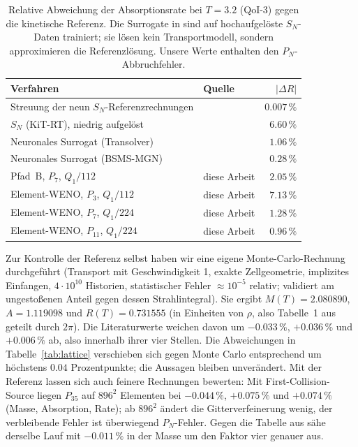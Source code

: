 \begin{table}[htbp]
  \centering
  \small
  \begin{tabular}{p{6.2cm}p{4.2cm}r}
    \toprule
    Verfahren & Quelle & $|\Delta R|$ \\
    \midrule
    Streuung der neun $S_N$-Referenzrechnungen & \cite{schotthoefer_hauck_2025} & $0.007\,\%$ \\
    $S_N$ (KiT-RT), niedrig aufgelöst          & \cite{gonzales_2026}           & $6.60\,\%$ \\
    Neuronales Surrogat (Transolver)          & \cite{gonzales_2026}           & $1.06\,\%$ \\
    Neuronales Surrogat (BSMS-MGN)            & \cite{gonzales_2026}           & $0.28\,\%$ \\
    \midrule
    Pfad~B, $P_7$, $Q_1/112$                  & diese Arbeit & $2.05\,\%$ \\
    Element-WENO, $P_3$, $Q_1/112$            & diese Arbeit & $7.13\,\%$ \\
    Element-WENO, $P_7$, $Q_1/224$            & diese Arbeit & $1.28\,\%$ \\
    Element-WENO, $P_{11}$, $Q_1/224$         & diese Arbeit & $0.96\,\%$ \\
    \bottomrule
  \end{tabular}
  \caption{Relative Abweichung der Absorptionsrate bei $T=3.2$ (QoI-3) gegen die kinetische
           Referenz. Die Surrogate in \cite{gonzales_2026} sind auf hochaufgelöste $S_N$-Daten
           trainiert; sie lösen kein Transportmodell, sondern approximieren die Referenzlösung.
           Unsere Werte enthalten den $P_N$-Abbruchfehler.}
  \label{tab:lattice:lit}
\end{table}

Zur Kontrolle der Referenz selbst haben wir eine eigene Monte-Carlo-Rechnung durchgeführt
(Transport mit Geschwindigkeit 1, exakte Zellgeometrie, implizites Einfangen, $4\cdot10^{10}$
Historien, statistischer Fehler $\approx10^{-5}$ relativ; validiert am ungestoßenen Anteil gegen
dessen Strahlintegral). Sie ergibt $M(T)=2.080890$, $A=1.119098$ und $R(T)=0.731555$ (in
Einheiten von $\rho$, also Tabelle~1 aus \cite{schotthoefer_hauck_2025} geteilt durch $2\pi$). Die
Literaturwerte weichen davon um $-0.033\,\%$, $+0.036\,\%$ und $+0.006\,\%$ ab, also innerhalb ihrer
vier Stellen. Die Abweichungen in Tabelle~\ref{tab:lattice} verschieben sich gegen Monte Carlo
entsprechend um höchstens $0.04$ Prozentpunkte; die Aussagen bleiben unverändert.
Mit der Referenz lassen sich auch feinere Rechnungen bewerten: Mit First-Collision-Source liegen
$P_{35}$ auf $896^2$ Elementen bei $-0.044\,\%$, $+0.075\,\%$ und $+0.074\,\%$ (Masse, Absorption,
Rate); ab $896^2$ ändert die Gitterverfeinerung wenig, der verbleibende Fehler ist überwiegend
$P_N$-Fehler. Gegen die Tabelle aus \cite{schotthoefer_hauck_2025} sähe derselbe Lauf mit
$-0.011\,\%$ in der Masse um den Faktor vier genauer aus.

